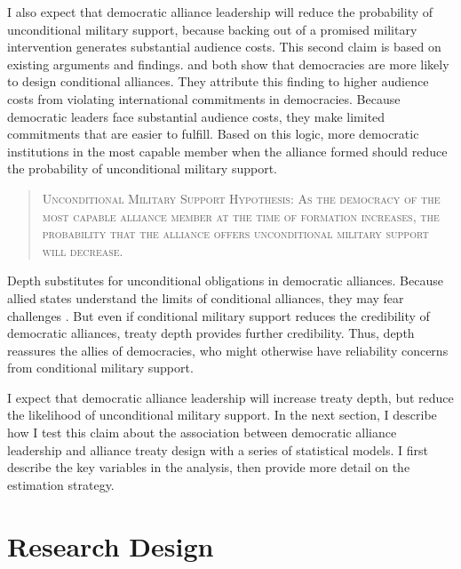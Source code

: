 \documentclass[12pt]{article}
\begin{document}
I also expect that democratic alliance leadership will reduce the probability of unconditional military support, because backing out of a promised military intervention generates substantial audience costs. 
This second claim is based on existing arguments and findings. 
\citet{Mattes2012} and \citet{Chibaetal2015} both show that democracies are more likely to design conditional alliances. 
They attribute this finding to higher audience costs from violating international commitments in democracies. 
Because democratic leaders face substantial audience costs, they make limited commitments that are easier to fulfill. 
Based on this logic, more democratic institutions in the most capable member when the alliance formed should reduce the probability of unconditional military support.


\begin{quote}
\textsc{Unconditional Military Support Hypothesis: As the democracy of the most capable alliance member at the time of formation increases, the probability that the alliance offers unconditional military support will decrease.}
\end{quote} 


Depth substitutes for unconditional obligations in democratic alliances.  
Because allied states understand the limits of conditional alliances, they may fear challenges \citep{Smith1995}. 
But even if conditional military support reduces the credibility of democratic alliances, treaty depth provides further credibility. 
Thus, depth reassures the allies of democracies, who might otherwise have reliability concerns from conditional military support. 


I expect that democratic alliance leadership will increase treaty depth, but reduce the likelihood of unconditional military support.
In the next section, I describe how I test this claim about the association between democratic alliance leadership and alliance treaty design with a series of statistical models. 
I first describe the key variables in the analysis, then provide more detail on the estimation strategy.


\section{Research Design}
\end{document}

